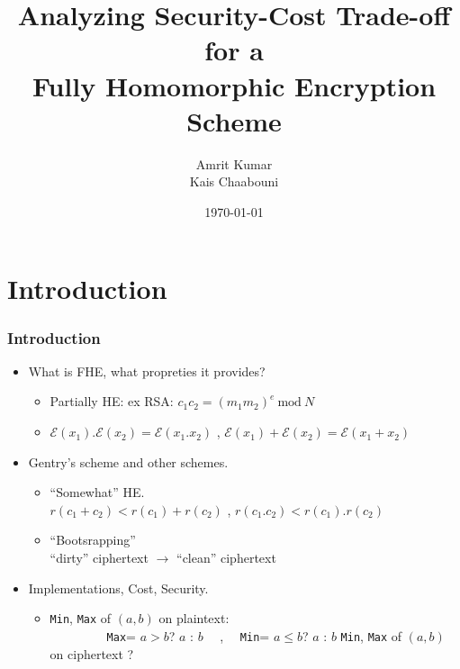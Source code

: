 \documentclass{beamer}
\title[Fully Homomorphic Encryption Scheme]{Analyzing Security-Cost Trade-off for a\\Fully Homomorphic Encryption Scheme}
\author{Amrit Kumar \\ Kais Chaabouni \\}
\date{\today}
\institute{Ensimag}
\begin{document}
\begin{frame}
  \titlepage
\end{frame}

\section{Introduction}

\begin{frame}\frametitle{Introduction}
  \begin{itemize}
  \item What is FHE, what propreties it provides?\\
    
    \begin{itemize}
      \pause
    \item Partially HE: ex RSA: $c_1c_2=(m_1m_2)^e \ \textrm {mod}\ N$
      \pause
    \item $\mathcal{E}(x_1).\mathcal{E}(x_2)=\mathcal{E}(x_1.x_2)$ , $\mathcal{E}(x_1)+\mathcal{E}(x_2)=\mathcal{E}(x_1+x_2)$   
      
    \end{itemize}
    \pause
  \item Gentry's scheme and other schemes.  
    
    \begin{itemize}
      \pause
    \item ``Somewhat'' HE. \\ 
      \pause
      $r(c_1+c_2) < r(c_1)+r(c_2)$ , $r(c_1.c_2) < r(c_1).r(c_2)$
      \pause
    \item ``Bootsrapping'' \\ 
      \pause
      ``dirty'' ciphertext $\rightarrow$ ``clean'' ciphertext
      
    \end{itemize}
    \pause
  \item Implementations, Cost, Security. \\
    
    \begin{itemize}
      \pause
    \item \texttt{Min}, \texttt{Max} of $(a,b)$ on plaintext:\\
      \ \ \ \ \ \ \ \ \ \texttt{Max}= $a > b$? $a$ : $b$ \ \ , \ \ \texttt{Min}= $a \leq b$? $a$ : $b$ 
      \pause
      \texttt{Min}, \texttt{Max} of $(a,b)$ on ciphertext ?

    \end{itemize}
  \end{itemize}
\end{frame}
\end{document}
